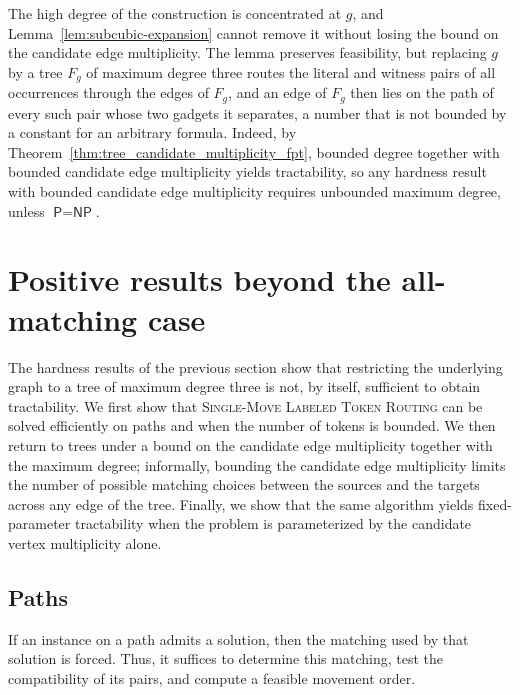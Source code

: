 \documentclass[a4paper,USenglish,thm-restate]{lipics-v2021}
\theoremstyle{problemstyle}
\begin{document}
The high degree of the construction is concentrated at $g$, and
Lemma~\ref{lem:subcubic-expansion} cannot remove it without losing the
bound on the candidate edge multiplicity. The lemma preserves feasibility,
but replacing $g$ by a tree $F_g$ of maximum degree three routes the
literal and witness pairs of all occurrences through the edges of $F_g$,
and an edge of $F_g$ then lies on the path of every such pair whose two
gadgets it separates, a number that is not bounded by a constant for an
arbitrary formula. Indeed, by
Theorem~\ref{thm:tree_candidate_multiplicity_fpt}, bounded degree together
with bounded candidate edge multiplicity yields tractability, so any
hardness result with bounded candidate edge multiplicity requires unbounded
maximum degree, unless $\textsf{P}=\textsf{NP}$.

\section{Positive results beyond the all-matching case}
\label{sec:positive}

The hardness results of the previous section show that restricting the
underlying graph to a tree of maximum degree three is not, by itself,
sufficient to obtain tractability. We first show that \textsc{Single-Move
Labeled Token Routing} can be solved efficiently on paths and when the number
of tokens is bounded. We then return to trees under a bound on the candidate
edge multiplicity together with the maximum degree; informally, bounding the
candidate edge multiplicity limits the number of possible matching choices
between the sources and the targets across any edge of the tree. Finally, we
show that the same algorithm yields fixed-parameter tractability when the
problem is parameterized by the candidate vertex multiplicity alone.

\subsection{Paths}
\label{sec:paths}

If an instance on a path admits a solution, then the matching used by
that solution is forced. Thus, it suffices to determine this matching, test
the compatibility of its pairs, and compute a feasible movement order.

\pathTime*
\end{document}
